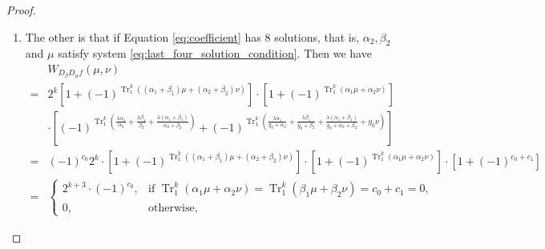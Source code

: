 \documentclass{article}
\newcommand{\F}{\mathbb{F}}
\newcommand{\0}{\textbf{0}}
\newcommand{\1}{\textbf{1}}
\newcommand{\TRACE}{\operatorname{Tr}_1^k}
\theoremstyle{plain}
\begin{document}
\begin{proof}
\begin{enumerate}[label=\textbf{Case \arabic*},wide = 0pt]
\begin{enumerate}[label=\textbf{Subcase \Alph{*}},itemindent=*,wide=\parindent]
\begin{equation}
\begin{alignedat}{2}
                        \TRACE\left(\beta_2\nu +\beta_1 \mu\right)&=0
                    \end{alignedat}
                    \right.
                \end{equation}
                is $2^{k-2}$, according to Lemma \ref{lemma:N_ij_trace}.
                Thus, for all points $\alpha=(\alpha_1,\alpha_2),\beta=(\beta_1,\beta_2) \in\F_{2^k}\times\F_{2^k}^*$, $\alpha_2\ne\beta_2$
                and $\mu=\frac{\lambda(\alpha_2^2+\beta_2^2+\alpha_2\beta_2)}{\alpha_2^2\beta_2+\alpha_2\beta_2^2}$
                such that don't satisfy Equations \eqref{eq:last_four_solution_condition}, we have
                \[\max_{\mu,\nu}|W_{D_{\beta}D_{\alpha}f}(\mu,\nu)|=2^{k+2}.\]

                \item The other is that if Equation \eqref{eq:coefficient} has $8$ solutions,
                that is, $\alpha_2,\beta_2$ and $\mu$ satisfy system \eqref{eq:last_four_solution_condition}.
                Then we have
                \begin{align*}
                &W_{D_{\beta}D_{\alpha}f}(\mu,\nu)\nonumber\\
                    =&2^k\left[1+(-1)^{\TRACE\left((\alpha_1+\beta_1)\mu+ (\alpha_2+\beta_2)\nu\right)}\right]\cdot
                    \left[1+(-1)^{\TRACE\left(\alpha_1\mu+\alpha_2\nu\right)}\right]\nonumber\\
                    &\cdot
                    \left[(-1)^{\TRACE\left(\frac{\lambda\alpha_1}{\alpha_2}+\frac{\lambda\beta_1}{\beta_2}+\frac{\lambda(\alpha_1+\beta_1)}{\alpha_2+\beta_2}\right)}+(-1)^{\TRACE\left(\frac{\lambda\alpha_1}{y_0+\alpha_2}+\frac{\lambda\beta_1}{y_0+\beta_2}+\frac{\lambda(\alpha_1+\beta_1)}{y_0+\alpha_2+\beta_2}+ y_0\nu\right)}\right]\nonumber\\
                    =&(-1)^{c_0}2^k\cdot\left[1+(-1)^{\TRACE\left((\alpha_1+\beta_1)\mu+ (\alpha_2+\beta_2)\nu\right)}\right]\cdot
                    \left[1+(-1)^{\TRACE\left(\alpha_1\mu+\alpha_2\nu\right)}\right]\cdot\left[1+(-1)^{c_0+c_1}\right]\nonumber\\
                    =&\begin{cases}
                        2^{k+3}\cdot(-1)^{c_0},&\text{if }\TRACE\left(\alpha_1\mu+\alpha_2\nu\right)=\TRACE\left(\beta_1\mu+\beta_2\nu\right)=c_0+c_1=0,\\
                        0,&\text{otherwise},
                    \end{cases}
                \end{align*}

\end{enumerate}
\end{enumerate}
\end{proof}
\end{document}

